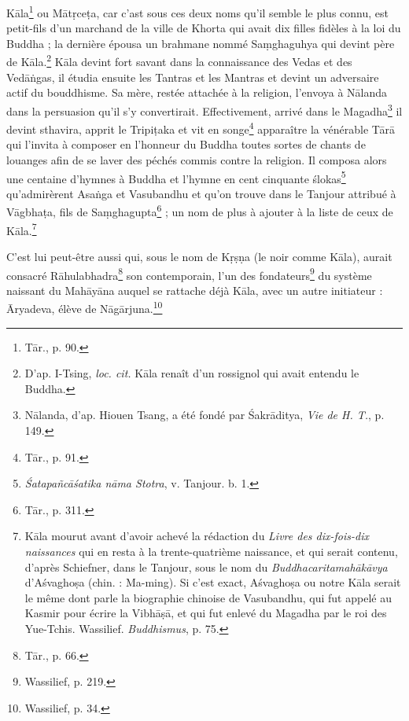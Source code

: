 \documentclass[a4paper, 11pt, oneside, french]{article}
\begin{document}
K\={a}la\footnote{T\={a}r., p. 90.} ou M\={a}t\d{r}ce\d{t}a, car c'ast sous ces deux noms qu'il semble le plus connu, est petit-fils d'un marchand de la ville de Khorta qui avait dix filles fidèles à la loi du Buddha ; la dernière épousa un brahmane nommé Sa\d{m}ghaguhya qui devint père de K\={a}la.\footnote{D'ap. I-Tsing, \emph{loc. cit.} K\={a}la renaît d'un rossignol qui avait entendu le Buddha.} K\={a}la devint fort savant dans la connaissance des Vedas et des Ved\={a}\.{n}gas, il étudia ensuite les Tantras et les Mantras et devint un adversaire actif du bouddhisme. Sa mère, restée attachée à la religion, l'envoya à N\={a}landa dans la persuasion qu'il s'y convertirait. Effectivement, arrivé dans le Magadha\footnote{N\={a}landa, d'ap. Hiouen Tsang, a été fondé par \'{S}akr\={a}ditya, \emph{Vie de H. T.}, p. 149.} il devint sthavira, apprit le Tripi\d{t}aka et vit en songe\footnote{T\={a}r., p. 91.} apparaître la vénérable T\={a}r\={a} qui l'invita à composer en l'honneur du Buddha toutes sortes de chants de louanges afin de se laver des péchés commis contre la religion. Il composa alors une centaine d'hymnes à Buddha et l'hymne en cent cinquante \'{s}lokas\footnote{\emph{\'{S}atapa\~{n}c\={a}\'{s}atika n\={a}ma Stotra}, v. Tanjour. b. 1.} qu'admirèrent Asa\.{n}ga et Vasubandhu et qu'on trouve dans le Tanjour attribué à V\={a}gbha\d{t}a, fils de Sa\d{m}ghagupta\footnote{T\={a}r., p. 311.} ; un nom de plus à ajouter à la liste de ceux de K\={a}la.\footnote{K\={a}la mourut avant d'avoir achevé la rédaction du \emph{Livre des dix-fois-dix naissances} qui en resta à la trente-quatrième naissance, et qui serait contenu, d'après Schiefner, dans le Tanjour, sous le nom du \emph{Buddhacaritamah\={a}k\={a}vya} d'A\'{s}vagho\d{s}a (chin. : Ma-ming). Si c'est exact, A\'{s}vagho\d{s}a ou notre K\={a}la serait le même dont parle la biographie chinoise de Vasubandhu, qui fut appelé au Kasmir pour écrire la Vibh\={a}\d{s}\={a}, et qui fut enlevé du Magadha par le roi des Yue-Tchis. Wassilief. \emph{Buddhismus}, p. 75.}

C'est lui peut-être aussi qui, sous le nom de K\d{r}\d{s}\d{n}a (le noir comme K\={a}la), aurait consacré R\={a}hulabhadra\footnote{T\={a}r., p. 66.} son contemporain, l'un des fondateurs\footnote{Wassilief, p. 219.} du système naissant du Mah\={a}y\={a}na auquel se rattache déjà K\={a}la, avec un autre initiateur : \={A}ryadeva, élève de N\={a}g\={a}rjuna.\footnote{Wassilief, p. 34.}
\end{document}
